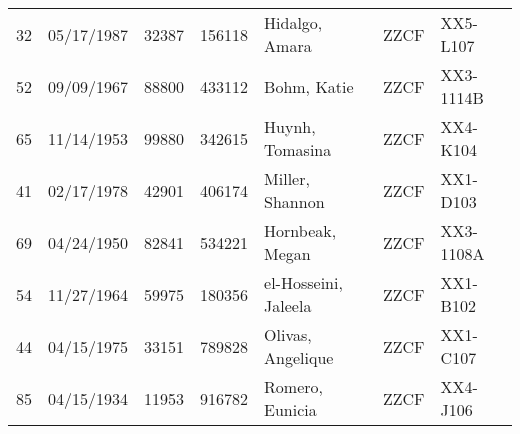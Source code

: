 \documentclass[]{article}
\begin{document}
\begin{tabular}{cccclll}
   32 & 05/17/1987 & 32387 & 156118 & Hidalgo, Amara & ZZCF & XX5-L107 \\ 
   52 & 09/09/1967 & 88800 & 433112 & Bohm, Katie & ZZCF & XX3-1114B \\ 
   65 & 11/14/1953 & 99880 & 342615 & Huynh, Tomasina & ZZCF & XX4-K104 \\ 
   41 & 02/17/1978 & 42901 & 406174 & Miller, Shannon & ZZCF & XX1-D103 \\ 
   69 & 04/24/1950 & 82841 & 534221 & Hornbeak, Megan & ZZCF & XX3-1108A \\ 
   54 & 11/27/1964 & 59975 & 180356 & el-Hosseini, Jaleela & ZZCF & XX1-B102 \\ 
   44 & 04/15/1975 & 33151 & 789828 & Olivas, Angelique & ZZCF & XX1-C107 \\ 
   85 & 04/15/1934 & 11953 & 916782 & Romero, Eunicia & ZZCF & XX4-J106 \\ 
  \end{tabular}
\end{document}

